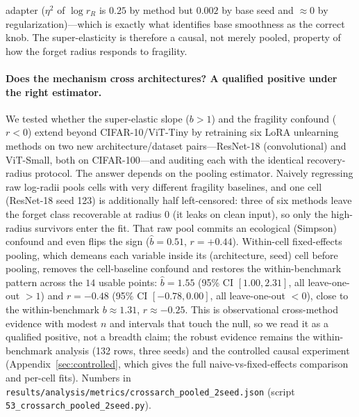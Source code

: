 \documentclass[11pt]{article}
\begin{document}
adapter ($\eta^2$ of $\log r_R$ is $0.25$ by method but $0.002$ by base seed and $\approx 0$ by regularization)---which is exactly what identifies base smoothness as the correct knob. The super-elasticity is therefore a causal, not merely pooled, property of how the forget radius responds to fragility.

\paragraph{Does the mechanism cross architectures? A qualified positive under the right estimator.} We tested whether the super-elastic slope ($b>1$) and the fragility confound ($r<0$) extend beyond CIFAR-10/ViT-Tiny by retraining six LoRA unlearning methods on two new architecture/dataset pairs---ResNet-18 (convolutional) and ViT-Small, both on CIFAR-100---and auditing each with the identical recovery-radius protocol. The answer depends on the pooling estimator. Naively regressing raw log-radii pools cells with very different fragility baselines, and one cell (ResNet-18 seed 123) is additionally half left-censored: three of six methods leave the forget class recoverable at radius $0$ (it leaks on clean input), so only the high-radius survivors enter the fit. That raw pool commits an ecological (Simpson) confound and even flips the sign ($\hat b=0.51$, $r=+0.44$). Within-cell fixed-effects pooling, which demeans each variable inside its (architecture, seed) cell before pooling, removes the cell-baseline confound and restores the within-benchmark pattern across the $14$ usable points: $\hat b=1.55$ (95\% CI $[1.00,2.31]$, all leave-one-out $>1$) and $r=-0.48$ (95\% CI $[-0.78,0.00]$, all leave-one-out $<0$), close to the within-benchmark $b\approx1.31$, $r\approx-0.25$. This is observational cross-method evidence with modest $n$ and intervals that touch the null, so we read it as a qualified positive, not a breadth claim; the robust evidence remains the within-benchmark analysis (132 rows, three seeds) and the controlled causal experiment (Appendix~\ref{sec:controlled}, which gives the full naive-vs-fixed-effects comparison and per-cell fits). Numbers in \texttt{results/analysis/metrics/crossarch\_pooled\_2seed.json} (script \texttt{53\_crossarch\_pooled\_2seed.py}).
\end{document}
